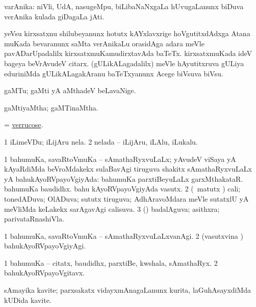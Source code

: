 \bentry
{} 
\gl{\nA}
\expl{}
\bmng
 varAnika: 
\banum
{} niVli, UdA, nasugeMpu, biLibaNaNxgaLa hUvugaLanunx biDuva verAnika kulada giDagaLa jAti. 
\hypertarget{veronica(b)}{} 
 yeVsu kirxsatxnu shilubeyanunx hotutx kAYxlavxrige hoVgutitxdAdxga Atana muKada bevaranunx saMta verAnikaLu orasidAga adara meVle pavADarUpadalilx kirxsatxmuKamudirxtavAda baTeTx. 
 kirxsatxmuKada ideV bageya beVrAvudeV citarx. 
 (gULikALagadalilx) meVle hAyutitxruva gULiya eduriniMda gULikALagakAranu baTeTxyanunx Acege biVsuva biVsu. 
\eanum
\emng
\eentry

\bentry
{} 
\gl{\nA}
\bmng
 gaMTu; gaMti yA aMthadeV beLavaNige. 
\emng
\eentry

\bentry
{} 
\gl{\gu}
\expl{}
\bmng
 gaMtiyaMtha; gaMTinaMtha. 
\emng
\eentry

\bentry
{} 
\gl{\gu}
\expl{}
\bmng
 = \hyperlink{verrucose}{verrucose}. 
\emng
\eentry

\bentry 
{} 
\gl{\nA}
\expl{}
\bmng
\bnum
\num{1} iLimeVDu; iLijAru nela. 
\num{2} nelada -- iLijAru, iLAlu, iLukalu. 
\enum
\emng
\eentry

\bentry
{} 
\gl{\gu}
\expl{}
\bmng
\bnum
\num{1} bahumuKa, savaRtoVmuKa -- sAmathaRyxvuLaLx; yAvudeV viSaya yA kAyaRdiMda beVroMdakekx sulaBavAgi tiruguva shakitx sAmathaRyxvuLaLx yA bahukAyoRVpayoVgiyAda:  bahumuKa parxtiBeyuLaLx garxMthakataR.  bahumuKa baudidhx.  bahu kAyoRVpayoVgiyAda vasutx. 
\num{2} (\pArxvi\ matutx \savi) cali; tonedADuva; OlADuva; sututx tiruguva; AdhAravoMdara meVle sutatxlU yA meVliMda keLakekx sarAgavAgi calisuva. 
\num{3} (\pArxparx) badalAguva; asithxra; parivataRnashiVla. 
\enum
\emng
\eentry

\bentry 
{} 
\gl{\kirxvi}
\expl{}
\bmng
\bnum
\num{1} bahumuKa, savaRtoVmuKa -- sAmathaRyxvuLaLxvanAgi. 
\num{2} (vasutxvina \vi) bahukAyoRVpayoVgiyAgi. 
\enum
\emng
\eentry

\bentry
{} 
\gl{\nA}
\expl{}
\bmng
\bnum
\num{1} bahumuKa -- citatx, baudidhx, parxtiBe, kwshala, sAmathaRyx. 
\num{2} bahukAyoRVpayoVgitavx. 
\enum
\emng
\eentry

\bentry
{} 
\gl{\nA}
\expl{\F}
\bmng
 sAmayika kavite; parxsakatx vidayxmAnagaLanunx kurita, laGuhAsayxdiMda kUDida kavite. 
\emng
\eentry

